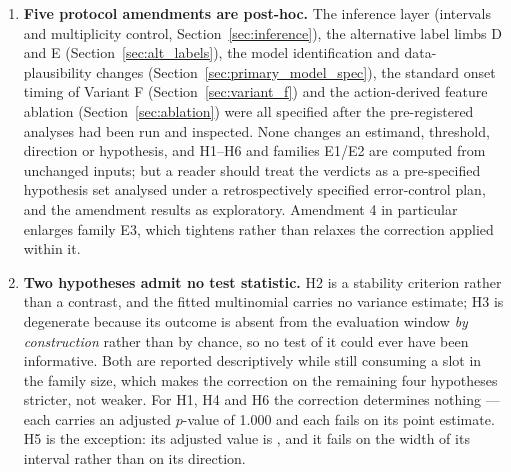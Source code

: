 \begin{enumerate}
    \item \textbf{Five protocol amendments are post-hoc.} The inference layer
    (intervals and multiplicity control, Section~\ref{sec:inference}), the
    alternative label limbs D and E (Section~\ref{sec:alt_labels}), the model
    identification and data-plausibility changes
    (Section~\ref{sec:primary_model_spec}), the standard onset timing of
    Variant F (Section~\ref{sec:variant_f}) and the action-derived feature
    ablation (Section~\ref{sec:ablation}) were all specified after the
    pre-registered analyses had been run and inspected. None changes an
    estimand, threshold, direction or hypothesis, and H1--H6 and families E1/E2
    are computed from unchanged inputs; but a reader should treat the verdicts
    as a pre-specified hypothesis set analysed under a retrospectively specified
    error-control plan, and the amendment results as exploratory. Amendment 4 in
    particular enlarges family E3, which tightens rather than relaxes the
    correction applied within it.

    \item \textbf{Two hypotheses admit no test statistic.} H2 is a stability
    criterion rather than a contrast, and the fitted multinomial carries no
    variance estimate; H3 is degenerate because its outcome is absent from the
    evaluation window \emph{by construction} rather than by chance, so no test
    of it could ever have been informative. Both are reported descriptively
    while still consuming a slot in the family size, which makes the correction
    on the remaining four hypotheses stricter, not weaker. For H1, H4 and H6
    the correction determines nothing --- each carries an adjusted $p$-value of
    1.000 and each fails on its point estimate. H5 is the exception: its
    adjusted value is \pcHFivePHolm, and it fails on the width of its interval
    rather than on its direction.
\end{enumerate}
